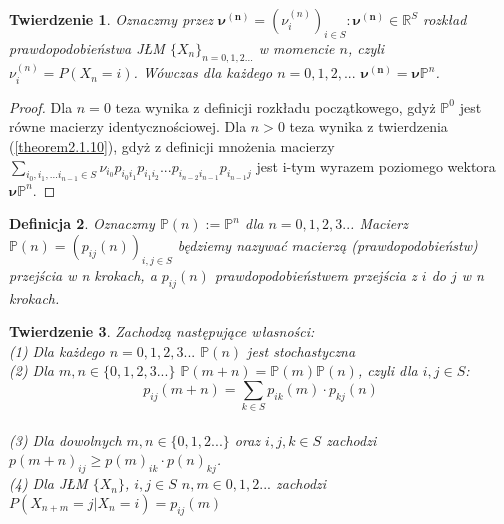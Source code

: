 \documentclass[a4paper]{article}
\theoremstyle{defn}
\newtheorem{defn}{Definicja}[subsection]
\theoremstyle{theorem}
\newtheorem{theorem}[defn]{Twierdzenie}
\theoremstyle{lemma}
\theoremstyle{cor}
\theoremstyle{fact}
\begin{document}
\begin{theorem}\label{theorem2.1.11}
Oznaczmy przez $\boldsymbol{\nu^{(n)}} = (\nu_i^{(n)})_{i \in S}: \boldsymbol{\nu^{(n)}} \in \mathbb{R}^S$ rozkład prawdopodobieństwa JŁM $\{X_n\}_{n = 0,1,2...}$ w momencie $n$, czyli $\nu^{(n)}_i = P(X_n = i)$. Wówczas dla każdego $n= 0,1,2,...$ $\boldsymbol{\nu^{(n)}} = \boldsymbol{\nu} \mathbb{P}^n$.
\end{theorem}
\begin{proof}
Dla $n=0$ teza wynika z definicji rozkładu początkowego, gdyż $\mathbb{P}^0$ jest równe macierzy identycznościowej. Dla $n>0$ teza wynika z twierdzenia (\ref{theorem2.1.10}), gdyż z definicji mnożenia macierzy $\sum\limits_{i_0, i_1,... i_{n-1} \in S} \nu_{i_0} p_{i_{0}i_{1}} p_{i_{1}i_{2}} ... p_{i_{n-2}i_{n-1}}p_{i_{n-1}j}$ jest i-tym wyrazem poziomego wektora $\boldsymbol{\nu} \mathbb{P}^n$.
\end{proof}
\begin{defn}\label{defn2.1.12}
Oznaczmy $\mathbb{P}(n) := \mathbb{P}^n$ dla $n=0,1,2,3..$. Macierz $\mathbb{P}(n) = (p_{ij}(n))_{i, j \in S}$ będziemy nazywać \textit{macierzą (prawdopodobieństw) przejścia w n krokach}, a $p_{ij}(n)$ \textit{prawdopodobieństwem przejścia z $i$ do $j$ w n krokach}.
\end{defn}
\begin{theorem}\label{theorem2.1.13} Zachodzą następujące własności:
\\(1) Dla każdego $n=0,1,2,3...$ $\mathbb{P}(n)$ jest stochastyczna
\\(2) Dla $m,n \in \{0,1,2,3...\}$ $\mathbb{P}(m+n) = \mathbb{P}(m)\mathbb{P}(n)$, czyli dla $i,j \in S$: $$p_{ij}(m+n) = \sum\limits_{k \in S} p_{ik}(m) \cdot p_{kj}(n)$$
\\(3) Dla dowolnych $m,n \in \{0,1,2...\}$ oraz $i,j,k \in S$ zachodzi $p(m+n)_{ij} \geq p(m)_{ik}\cdot p(n)_{kj}$.
\\(4) Dla JŁM $\{X_n\}$, $i,j \in S$ $n,m \in {0,1,2...}$ zachodzi $P(X_{n+m} = j|X_n = i) = p_{ij}(m)$
\end{theorem}
\end{document}
